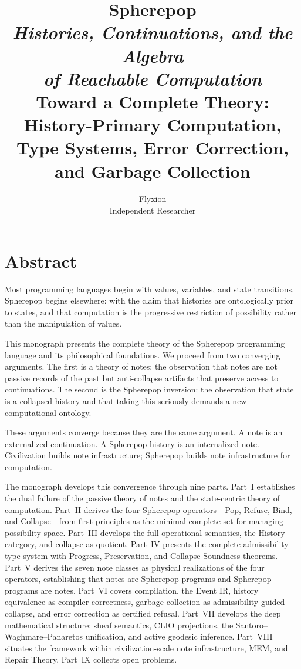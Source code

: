 \documentclass[12pt, a4paper, openany]{book}
\title{
  \vspace{2cm}
  {\Huge\bfseries Spherepop}\\[1em]
  {\large\itshape Histories, Continuations, and the Algebra\\
  of Reachable Computation}\\[3em]
  {\normalsize Toward a Complete Theory: History-Primary Computation,\\
  Type Systems, Error Correction, and Garbage Collection}
}
\author{Flyxion\\[0.5em]\small Independent Researcher}
\date{}
\theoremstyle{plain}
\theoremstyle{definition}
\theoremstyle{remark}
\begin{document}
\maketitle
\thispagestyle{empty}

\frontmatter

\chapter*{Abstract}

Most programming languages begin with values, variables, and state transitions.
Spherepop begins elsewhere: with the claim that histories are ontologically prior
to states, and that computation is the progressive restriction of possibility rather
than the manipulation of values.

This monograph presents the complete theory of the Spherepop programming language
and its philosophical foundations. We proceed from two converging arguments. The
first is a theory of notes: the observation that notes are not passive records of
the past but anti-collapse artifacts that preserve access to continuations. The
second is the Spherepop inversion: the observation that state is a collapsed
history and that taking this seriously demands a new computational ontology.

These arguments converge because they are the same argument. A note is an
externalized continuation. A Spherepop history is an internalized note. Civilization
builds note infrastructure; Spherepop builds note infrastructure for computation.

The monograph develops this convergence through nine parts. Part~I establishes
the dual failure of the passive theory of notes and the state-centric theory of
computation. Part~II derives the four Spherepop operators---Pop, Refuse, Bind, and
Collapse---from first principles as the minimal complete set for managing possibility
space. Part~III develops the full operational semantics, the History category, and
collapse as quotient. Part~IV presents the complete admissibility type system with
Progress, Preservation, and Collapse Soundness theorems. Part~V derives the
seven note classes as physical realizations of the four operators, establishing
that notes are Spherepop programs and Spherepop programs are notes. Part~VI covers
compilation, the Event IR, history equivalence as compiler correctness, garbage
collection as admissibility-guided collapse, and error correction as certified
refusal. Part~VII develops the deep mathematical structure: sheaf semantics, CLIO
projections, the Santoro--Waghmare--Panaretos unification, and active geodesic
inference. Part~VIII situates the framework within civilization-scale note
infrastructure, MEM, and Repair Theory. Part~IX collects open problems.
\end{document}
